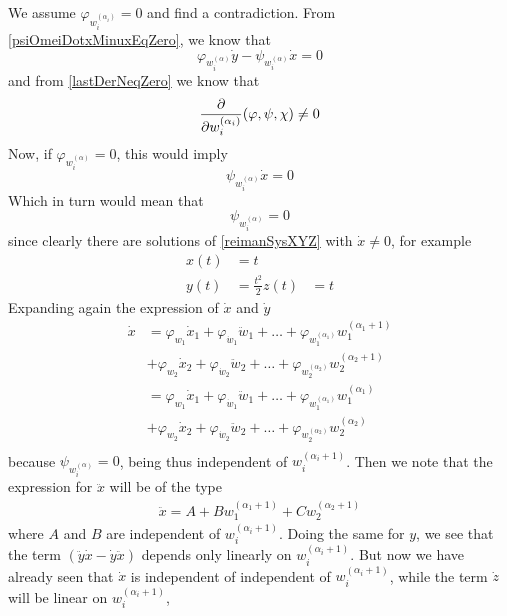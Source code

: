 \documentclass[12pt]{article}
\begin{document}
\begin{lemma} \label{varphiNeqZero}
  We assume $\varphi_{w_i^{(\alpha_i)}} = 0$ and find a contradiction.
  From \ref{psiOmeiDotxMinuxEqZero}, we know that
  \[ \varphi_{w_i^{(\alpha)}}\dot{y} - \psi_{w_i^{(\alpha)}}\dot{x}  = 0 \]
  and from \ref{lastDerNeqZero} we know that
  \[ \frac{\partial }{\partial w_i^{(\alpha_i)} }(\varphi, \psi, \chi) \neq 0 \]
  Now, if $\varphi_{w_i^{(\alpha)}} = 0$, this would imply
  \[ \psi_{w_i^{(\alpha)}}\dot{x}  = 0 \]
  Which in turn would mean that
  \[ \psi_{w_i^{(\alpha)}} = 0 \]
  since clearly there are solutions of \ref{reimanSysXYZ} with
  $\dot{x} \neq 0$, for example
  \begin{equation}\begin{aligned}
    x(t) &= t \\
    y(t) &= \frac{t^2}{2}
    z(t) &= t
  \end{aligned}\end{equation}
  Expanding again the expression of $\dot{x}$ and $\dot{y}$
  \begin{align*}
    \dot{x}
    &= \varphi_{w_1}\dot{x}_1
    + \varphi_{\dot{w}_1}\ddot{w}_1
    + \ldots
    + \varphi_{w_1^{(\alpha_1)}}w_1^{(\alpha_1 + 1)} \\
    &+ \varphi_{w_2}\dot{x}_2
    + \varphi_{\dot{w}_2}\ddot{w}_2
    + \ldots
    + \varphi_{w_2^{(\alpha_2)}}w_2^{(\alpha_2 + 1)} \\
    &= \varphi_{w_1}\dot{x}_1
    + \varphi_{\dot{w}_1}\ddot{w}_1
    + \ldots
    + \varphi_{w_1^{(\alpha_1)}}w_1^{(\alpha_1)} \\
    &+ \varphi_{w_2}\dot{x}_2
    + \varphi_{\dot{w}_2}\ddot{w}_2
    + \ldots
    + \varphi_{w_2^{(\alpha_2)}}w_2^{(\alpha_2)} \\ 
  \end{align*}
    because $\psi_{w_i^{(\alpha)}} = 0$, being thus independent of $w_i^{(\alpha_i+1)}$.
    Then we note that the expression for $\ddot{x}$ will be of the type
    \begin{align*}
      \ddot{x} = A 
      + B w_1^{(\alpha_1+1)} 
      + C w_2^{(\alpha_2+1)}
    \end{align*}
    where $A$ and $B$ are independent of $w_i^{(\alpha_i+1)}$.
    Doing the same for $y$, we see that the term $(\ddot{y}\dot{x} - \dot{y}\ddot{x})$
    depends only linearly on $w_i^{(\alpha_i+1)}$.
    But now we have already seen that $\dot{x}$ is independent of independent of
    $w_i^{(\alpha_i+1)}$, while the term $\dot{z}$ will be linear on $w_i^{(\alpha_i+1)}$,

\end{lemma}
\end{document}
